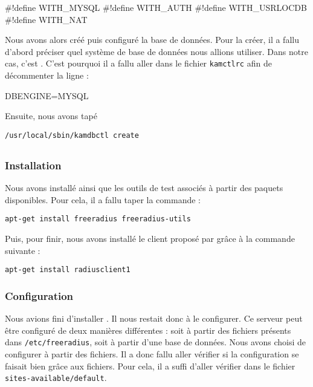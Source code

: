 \begin{kamcf}
#!define WITH_MYSQL
#!define WITH_AUTH
#!define WITH_USRLOCDB
#!define WITH_NAT
\end{kamcf}

Nous avons alors créé puis configuré la base de données. Pour la créer, il a fallu d'abord préciser quel système de base de données nous allions utiliser. Dans notre cas, c'est \my. C'est pourquoi il a fallu aller dans le fichier \texttt{kamctlrc} afin de décommenter la ligne :

\begin{kamcf}
DBENGINE=MYSQL
\end{kamcf}

Ensuite, nous avons tapé 
\begin{verbatim}
/usr/local/sbin/kamdbctl create
\end{verbatim}
\todo

\subsection{\frad}
\subsubsection{Installation}

Nous avons installé {\frad} ainsi que les outils de test associés à partir des paquets disponibles. Pour cela, il a fallu taper la commande :

\begin{verbatim}
apt-get install freeradius freeradius-utils
\end{verbatim}

Puis, pour finir, nous avons installé le client {\rad} proposé par {\frad} grâce à la commande suivante :

\begin{verbatim}
apt-get install radiusclient1
\end{verbatim}

\subsubsection{Configuration}
Nous avions fini d'installer {\frad}. Il nous restait donc à le configurer. Ce serveur {\rad} peut être configuré de deux manières différentes : soit à partir des fichiers présents dans \texttt{/etc/freeradius}, soit à partir d'une base de données. Nous avons choisi de configurer à partir des fichiers. Il a donc fallu aller vérifier si la configuration se faisait bien grâce aux fichiers. Pour cela, il a suffi d'aller vérifier dans le fichier \texttt{sites-available/default}.


